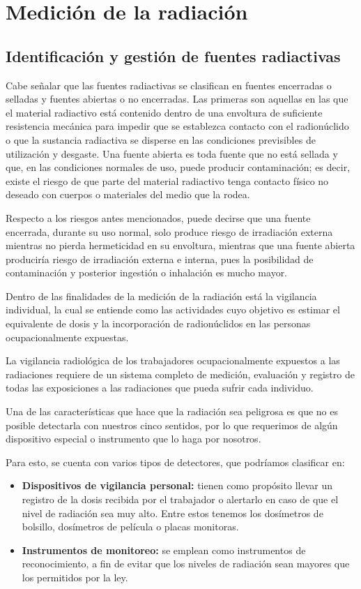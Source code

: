 \chapter{Medición de la radiación}

\section{Identificación y gestión de fuentes radiactivas}

Cabe señalar que las fuentes radiactivas se clasifican en fuentes encerradas o selladas y fuentes abiertas o no encerradas. Las primeras son aquellas en las que el material radiactivo está contenido dentro de una envoltura de suficiente resistencia mecánica para impedir que se establezca contacto con el radionúclido o que la sustancia radiactiva se disperse en las condiciones previsibles de utilización y desgaste. Una fuente abierta es toda fuente que no está sellada y que, en las condiciones normales de uso, puede producir contaminación; es decir, existe el riesgo de que parte del material radiactivo tenga contacto físico no deseado con cuerpos o materiales del medio que la rodea.

Respecto a los riesgos antes mencionados, puede decirse que una fuente encerrada, durante su uso normal, solo produce riesgo de irradiación externa mientras no pierda hermeticidad en su envoltura, mientras que una fuente abierta produciría riesgo de irradiación externa e interna, pues la posibilidad de contaminación y posterior ingestión o inhalación es mucho mayor.

Dentro de las finalidades de la medición de la radiación está la vigilancia individual, la cual se entiende como las actividades cuyo objetivo es estimar el equivalente de dosis y la incorporación de radionúclidos en las personas ocupacionalmente expuestas.

La vigilancia radiológica de los trabajadores ocupacionalmente expuestos a las radiaciones requiere de un sistema completo de medición, evaluación y registro de todas las exposiciones a las radiaciones que pueda sufrir cada individuo.

Una de las características que hace que la radiación sea peligrosa es que no es posible detectarla con nuestros cinco sentidos, por lo que requerimos de algún dispositivo especial o instrumento que lo haga por nosotros.

Para esto, se cuenta con varios tipos de detectores, que podríamos clasificar en:
\begin{itemize}
  \item \textbf{Dispositivos de vigilancia personal:} tienen como propósito llevar un registro de la dosis recibida por el trabajador o alertarlo en caso de que el nivel de radiación sea muy alto. Entre estos tenemos los dosímetros de bolsillo, dosímetros de película o placas monitoras.
  \item \textbf{Instrumentos de monitoreo:} se emplean como instrumentos de reconocimiento, a fin de evitar que los niveles de radiación sean mayores que los permitidos por la ley.
\end{itemize}

